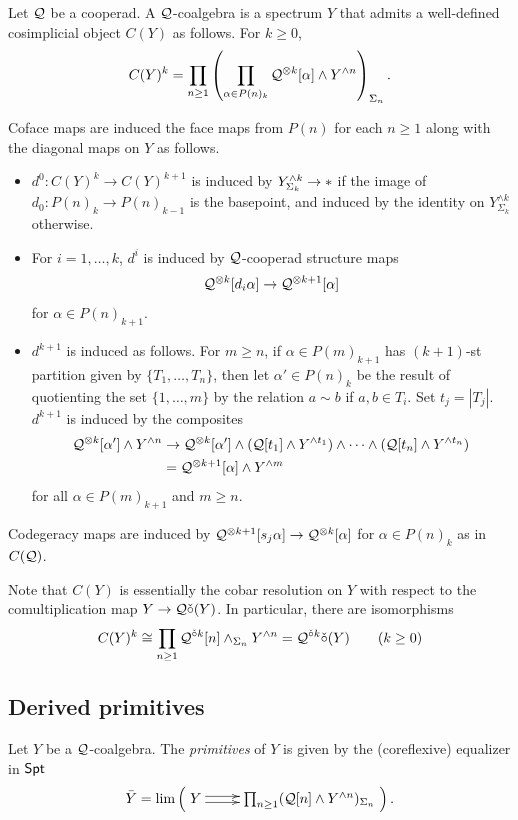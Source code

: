 \begin{definition}
    Let $\mathcal{Q}$ be a cooperad. A $\mathcal{Q}$-coalgebra is a spectrum $Y$ that admits a well-defined cosimplicial object $C(Y)$ as follows. For $k\geq 0$, \[ C(Y)^k=\prod_{n\geq 1} \left( \prod_{\alpha \in P(n)_k} \mathcal{Q}^{\otimes k}[\alpha] \wedge Y^{\wedge n}\right)_{\Sigma_n }.\]

Coface maps are induced the face maps from $P(n)$ for each $n\geq 1$ along with the diagonal maps on $Y$ as follows. \begin{itemize}
    \item $d^0\colon C(Y)^{k}\to C(Y)^{k+1}$ is induced by $Y^{\wedge k}_{\Sigma_k} \to *$ if the image of $d_0\colon P(n)_{k}\to P(n)_{k-1}$ is the basepoint, and induced by the identity on $Y^{\wedge k}_{\Sigma_k}$ otherwise. 
    \item For $i=1,\dots,k$, $d^i$ is induced by $\mathcal{Q}$-cooperad structure maps \[ \mathcal{Q}^{\otimes k}[d_i\alpha]\to \mathcal{Q}^{\otimes k+1}[\alpha]\] for $\alpha\in P(n)_{k+1}$.
    \item $d^{k+1}$ is induced as follows. For $m\geq n$, if $\alpha\in P(m)_{k+1}$ has $(k+1)$-st partition given by $\{T_1,\dots,T_n\}$, then let $\alpha'\in P(n)_k$ be the result of quotienting the set $\{1,\dots,m\}$ by the relation $a\sim b$ if $a,b\in T_i$. Set $t_j=|T_j|$. $d^{k+1}$ is induced by the composites \begin{align*} \mathcal{Q}^{\otimes k}[\alpha']\wedge Y^{\wedge n} 
    &\to \mathcal{Q}^{\otimes k}[\alpha']\wedge (\mathcal{Q}[t_1]\wedge Y^{\wedge t_1}) \wedge \cdots \wedge (\mathcal{Q}[t_n]\wedge Y^{\wedge t_n}) \\
    & = \mathcal{Q}^{\otimes k+1}[\alpha]\wedge Y^{\wedge m}\end{align*} for all $\alpha\in P(m)_{k+1}$ and $m\geq n$. 
\end{itemize}
Codegeracy maps are induced by $\mathcal{Q}^{\otimes k+1}[s_j\alpha]\to \mathcal{Q}^{\otimes k}[\alpha]$ for $\alpha\in P(n)_k$ as in $C(\mathcal{Q})$.
\end{definition}

\begin{remark}
    Note that $C(Y)$ is essentially the cobar resolution on $Y$ with respect to the comultiplication map $Y\to \mathcal{Q}\check{\circ} (Y)$. In particular, there are isomorphisms \[C(Y)^k\cong \prod_{n\geq 1} \mathcal{Q}^{\check{\circ} k}[n]\wedge_{\Sigma_n} Y^{\wedge n}= \mathcal{Q}^{\check{\circ} k}\check{\circ} (Y) \quad \quad (k\geq 0)\]  
\end{remark}
\subsection{Derived primitives} 
Let $Y$ be a $\mathcal{Q}$-coalgebra. The \textit{primitives} of $Y$ is given by the (coreflexive) equalizer in $\mathsf{Spt}$ \begin{equation} \label{eq:primitives}
    \bar{Y} = \lim \left( \xymatrix{ Y\ar@<.5ex>[r] \ar@<-.5ex>[r] & \prod_{n\geq 1} (\Cal{Q}[n]\wedge Y^{\wedge n})_{\Sigma_n}} \right). 
\end{equation}

